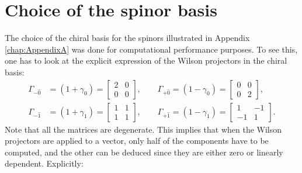 \section*{Choice of the spinor basis}
The choice of the chiral basis for the spinors illustrated in Appendix \ref{chap:AppendixA} was done for computational performance purposes. 
To see this, one has to look at the explicit expression of the Wilson projectors in the chiral basis:
\begin{equation*}
    \begin{aligned}
        \Gamma_{- \hat 0} &= \left(1+\gamma_0\right)=\left[\begin{array}{ll}
            2 & 0 \\
            0 & 0
            \end{array}\right],
        \qquad 
        \Gamma_{+ \hat 0} = \left(1-\gamma_0\right)=\left[\begin{array}{ll}
            0 & 0 \\
            0 & 2
            \end{array}\right],\\
        \Gamma_{- \hat 1} &= \left(1+\gamma_1\right)=\left[\begin{array}{ll}
            1 & 1 \\
            1 & 1
            \end{array}\right],
        \qquad 
        \Gamma_{+ \hat 1} = \left(1-\gamma_1\right)=\left[\begin{array}{cc}
            1 & -1 \\
            -1 & 1
            \end{array}\right].
    \end{aligned}
\end{equation*}
Note that all the matrices are degenerate. This implies that when the Wilson projectors are applied to a vector, only half of the components have to be computed, and the other can be deduced since they are either zero or linearly dependent. Explicitly:
